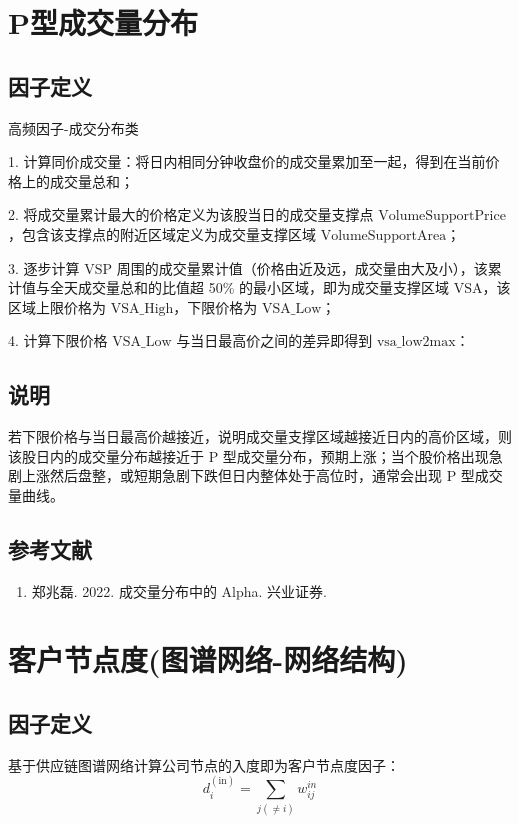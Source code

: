 \documentclass{article}
\begin{document}
\section{P型成交量分布}

\subsection{因子定义}
高频因子-成交分布类

1. 计算同价成交量：将日内相同分钟收盘价的成交量累加至一起，得到在当前价格上的成交量总和；

2. 将成交量累计最大的价格定义为该股当日的成交量支撑点 \( \mathrm{VolumeSupportPrice} \)，包含该支撑点的附近区域定义为成交量支撑区域 \( \mathrm{VolumeSupportArea} \)；

3. 逐步计算 \( \mathrm{VSP} \) 周围的成交量累计值（价格由近及远，成交量由大及小），该累计值与全天成交量总和的比值超 50\% 的最小区域，即为成交量支撑区域 \( \mathrm{VSA} \)，该区域上限价格为 \( \mathrm{VSA\_High} \)，下限价格为 \( \mathrm{VSA\_Low} \)；

4. 计算下限价格 \( \mathrm{VSA\_Low} \) 与当日最高价之间的差异即得到 \( \mathrm{vsa\_low2max} \)：


\subsection{说明}
若下限价格与当日最高价越接近，说明成交量支撑区域越接近日内的高价区域，则该股日内的成交量分布越接近于 P 型成交量分布，预期上涨；当个股价格出现急剧上涨然后盘整，或短期急剧下跌但日内整体处于高位时，通常会出现 P 型成交量曲线。

\subsection{参考文献}
\begin{enumerate}
    \item 郑兆磊. 2022. 成交量分布中的 Alpha. 兴业证券.
\end{enumerate}

\section{客户节点度(图谱网络-网络结构)}

\subsection{因子定义}

基于供应链图谱网络计算公司节点的入度即为客户节点度因子：
\begin{equation}
    d^{\mathrm{(in)}}_i = \sum_{j (\neq i)} w_{ij}^{in}
\end{equation}
\end{document}
